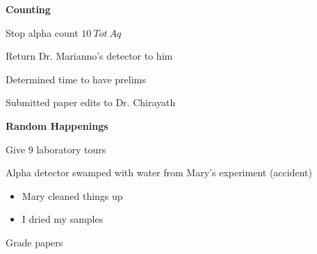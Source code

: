 \documentclass[idxtotoc,hyperref,openany,oneside]{labbook} %
\newcommand{\cmark}{\ding{51}}%
\newcommand{\done}{\rlap{$\square$}{\raisebox{2pt}{\large\hspace{1pt}\cmark}}%
  \hspace{-2.5pt}}
\begin{document}




\textbf{Counting}
\begin{todolist}
\item[\done]{Stop alpha count $\boxed{10\ Tot\ Aq}$}
\item[\done]{Return Dr. Marianno's detector to him}
\end{todolist}


\begin{todolist}
\item[\done]{Determined time to have prelims}
\item[\done]{Submitted paper edits to Dr. Chirayath}
\end{todolist}






\textbf{Random Happenings}
\begin{todolist}
\item[\done]{Give 9 laboratory tours}
\item[\done]{Alpha detector swamped with water from Mary's experiment (accident)}
  \begin{itemize}
  \item{Mary cleaned things up}
  \item{I dried my samples}
  \end{itemize}
\end{todolist}



\begin{todolist}
\item[\done]{Grade papers}
\end{todolist}





\end{document}

